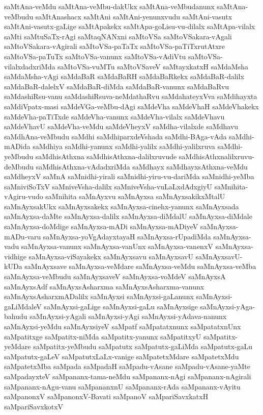 {saMtAna-veMdu
saMtAna-veMbu-dakUkx
saMtAna-veMbudanunx
saMtAna-veMbudu
saMtAnashacx
saMtAni
saMtAni-yenunxvudu
saMtAni-vasutx
saMtAni-vasutx-gaLige
saMtApakekx
saMtApa-goLisu-vu-dilalx
saMtApa-vilalx
saMti
saMtuSaTx-rAgi
saMtaqNANxni
saMtoVSa
saMtoVSakara-vAgali
saMtoVSakara-vAgirali
saMtoVSa-paTaTx
saMtoVSa-paTiTxrutAtxre
saMtoVSa-paTuTx
saMtoVSa-vanunx
saMtoVSa-vAdiVtu
saMtoVSa-vilalxdadxriMda
saMtoVSa-vuMTu
saMtoVSaveV
saMtayxkatxH
saMdaMsha
saMdaMsha-vAgi
saMdaBaR
saMdaBaRH
saMdaBaRkekx
saMdaBaR-dalilx
saMdaBaR-dalelxV
saMdaBaR-diMda
saMdaBaR-vanunx
saMdaBaRvu
saMdashiRsu-vanu
saMdashiRsuva-neMdathaRvu
saMdahateyxVva
saMdihayxta
saMdiVpatx-masi
saMdeVGa-veMbu-dAgi
saMdeVha
saMdeVhaH
saMdeVhakekx
saMdeVha-paTiTxde
saMdeVha-vanunx
saMdeVha-vilalx
saMdeVhavu
saMdeVhavU
saMdeVha-veMdu
saMdeVheyxV
saMdha-vilalxde
saMdhavu
saMdhAna-veMbudu
saMdhi
saMdhiparxdeVshada
saMdhi-BAga-vAda
saMdhi-mADida
saMdhiya
saMdhi-yanunx
saMdhi-yalilx
saMdhi-yalilxruva
saMdhi-yeMbudu
saMdhisAthxna
saMdhisAthxna-dalilxruvude
saMdhisAthxnalilxruvu-deMbudu
saMdhisAthxna-vAdadxriMda
saMdhayx
saMdhayxsAthxna-veMdu
saMdheyxV
saMnA
saMnidhi-yirali
saMnidhi-yiru-vu-dariMda
saMnidhi-yeMba
saMniviSoTxV
saMniveVsha-dalilx
saMniveVsha-vuLaLxdAdxgiyU
saMnihita-vAgiru-vudo
saMnihita
saMnAyxvu
saMnAyxsa
saMnAyxsakikxMtalU
saMnAyxsakUkx
saMnAyxsakekx
saMnAyxsa-cinehx-yanunx
saMnAyxsada
saMnAyxsa-daMte
saMnAyxsa-dalilx
saMnAyxsa-diMdalU
saMnAyxsa-diMdale
saMnAyxsa-doMdige
saMnAyxsa-mADi
saMnAyxsa-mADiyeV
saMnAyxsa-mADu-varu
saMnAyxsa-yoVgAdayxtayaH
saMnAyxsa-rUpadiMda
saMnAyxsa-vadu
saMnAyxsa-vanunx
saMnAyxsa-vanUnx
saMnAyxsa-vanenxV
saMnAyxsa-vidhige
saMnAyxsa-viSayakekx
saMnAyxsavu
saMnAyxsavU
saMnAyxsavU-kUDa
saMnAyxsave
saMnAyxsa-veMdare
saMnAyxsa-veMdu
saMnAyxsa-veMba
saMnAyxsa-veMbudu
saMnAyxsaveV
saMnAyxsa-voMdeV
saMnAyxsA
saMnAyxsAdf
saMnAyxsAsharxma
saMnAyxsAsharxma-vanunx
saMnAyxsAsharxmADalilx
saMnAyxsi
saMnAyxsi-gaLanunx
saMnAyxsi-gaLiMdaleV
saMnAyxsi-gaLige
saMnAyxsi-gaLu
saMnAyxsige
saMnAyxsi-yAga-bahudu
saMnAyxsi-yAgali
saMnAyxsi-yAgi
saMnAyxsi-yAdava-nanunx
saMnAyxsi-yeMdu
saMnAyxsiyeV
saMpatf
saMpatatxnunx
saMpatatxnUnx
saMpatitxge
saMpatitx-niMda
saMpatitx-yanunx
saMpatitxyU
saMpatitx-yeMdare
saMpatitx-yeMbudu
saMpatutx
saMpatutx-gaLiMda
saMpatutx-gaLu
saMpatutx-gaLeV
saMpatutxLaLx-vanige
saMpatetxMdare
saMpatetxMdu
saMpatetxMba
saMpada
saMpadaH
saMpadu-vAsane
saMpadu-vAsane-yaMte
saMpadayxteV
saMpananx-tama-neMdu
saMpananx-nAgi
saMpananx-nAgirali
saMpananx-nAgu-vanu
saMpananxnU
saMpananx-rAda
saMpananx-vAyitu
saMpanonxV
saMpanonxV-Bavati
saMpanoV
saMpariSavxkatxH
saMpariSavxkotxV
}

